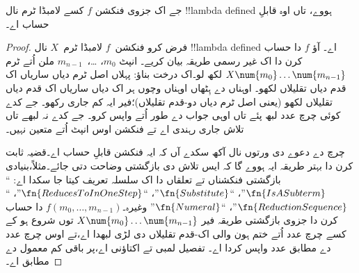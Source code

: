 \documentclass[../../../include/open-logic-section]{subfiles}
\begin{document}

\begin{thm}
جے اک جزوی فنکشن $f$ کسے لامبڈا ٹرم نال !!{lambda defined}
ہووے، تاں اوہ قابلِ حساب اے۔
\end{thm}

\begin{proof}
فرض کرو فنکشن~$f$ لامبڈا ٹرم~$X$ نال !!{lambda defined}
اے۔ آؤ $f$ دا حساب کرن دا اک غیر رسمی طریقہ بیان کریے۔
انپٹ $m_0$، \dots،~$m_{n-1}$ ملن اُتے ٹرم
$X \num{m_0} \ldots \num{m_{n-1}}$ لکھ لو۔اک درخت بناؤ:
پہلاں اصل ٹرم دیاں ساریاں اک قدم دیاں تقلیلاں لکھو۔ اوہناں دے
ہِٹھاں اوہناں وچوں ہر اک دیاں ساریاں اک قدم دیاں تقلیلاں لکھو
(یعنی اصل ٹرم دیاں دو-قدم تقلیلاں)؛فیر ایہ کم جاری رکھو۔
جے کدے کوئی چرچ عدد لبھ پئے تاں اوہی جواب دے طور اُتے واپس کرو۔
جے کدے نہ لبھے تاں تلاش جاری رہندی اے تے فنکشن اوس انپٹ اُتے متعین نہیں۔

چرچ دے دعوے دی ورتوں نال آکھ سکدے آں کہ ایہ فنکشن قابلِ
حساب اے۔قضیہ ثابت کرن دا بہتر طریقہ ایہ ہووے گا کہ ایس
تلاش دی بازگشتی وضاحت دتی جائے۔مثلاً،بنیادی بازگشتی فنکشناں
تے تعلقاں دا اک سلسلہ تعریف کیتا جا سکدا اے:
``$\fn{IsASubterm}$''، ``$\fn{Substitute}$''،
``$\fn{ReducesToInOneStep}$''، ``$\fn{ReductionSequence}$''،
``$\fn{Numeral}$'' وغیرہ۔$f(m_0, \dots, m_{n-1})$
دا حساب کرن دا جزوی بازگشتی طریقہ فیر
$X \num{m_0} \dots \num{m_{n-1}}$ توں شروع ہو کے
کسے چرچ عدد اُتے ختم ہون والی اک-قدم تقلیلاں دی لڑی
لبھدا اے،تے اوس چرچ عدد دے مطابق عدد واپس کردا اے۔
تفصیل لمبی تے اکتاؤنی اے،پر باقی کم معمول دے مطابق اے۔
\end{proof}
\end{document}

